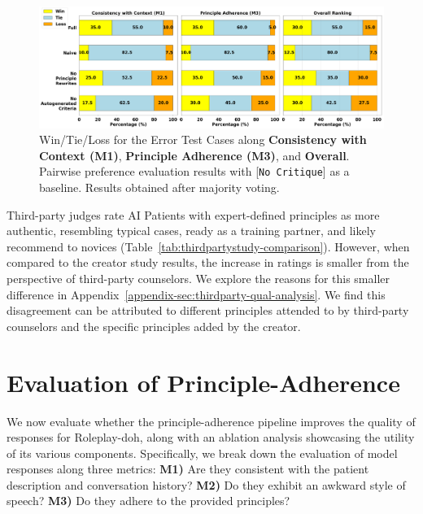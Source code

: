 \documentclass[11pt]{article}
\begin{document}
\begin{figure}
    \centering
    \includegraphics[width=\textwidth]{figures/error_2.png}\vspace{-0.05in}
    \caption{\small{Win/Tie/Loss for the Error Test Cases along \textbf{Consistency with Context (M1)}, \textbf{Principle Adherence (M3)}, and \textbf{Overall}. Pairwise preference evaluation results with [\texttt{No Critique}] as a baseline. Results obtained after majority voting.}}
    \label{fig:wtl-error}
\end{figure}

Third-party judges rate AI Patients with expert-defined principles as more authentic, resembling typical cases, ready as a training partner, and likely recommend to novices (Table~\ref{tab:thirdpartystudy-comparison}). 
However, when compared to the creator study results, the increase in ratings is smaller from the perspective of third-party counselors.
We explore the reasons for this smaller difference in Appendix~\ref{appendix-sec:thirdparty-qual-analysis}.
We find this disagreement can be attributed to different principles attended to by third-party counselors and the specific principles added by the creator. 
\vspace{-0.05in}
\section{Evaluation of Principle-Adherence}
\label{sec:evalpap}
\vspace{-0.05in}
We now evaluate whether the principle-adherence pipeline improves the quality of responses for Roleplay-doh, along with an ablation analysis showcasing the utility of its various components. Specifically, we break down the evaluation of model responses along three metrics: \textbf{M1)} Are they consistent with the patient description and conversation history? \textbf{M2)} Do they exhibit an awkward style of speech? \textbf{M3)} Do they adhere to the provided principles?
\end{document}
